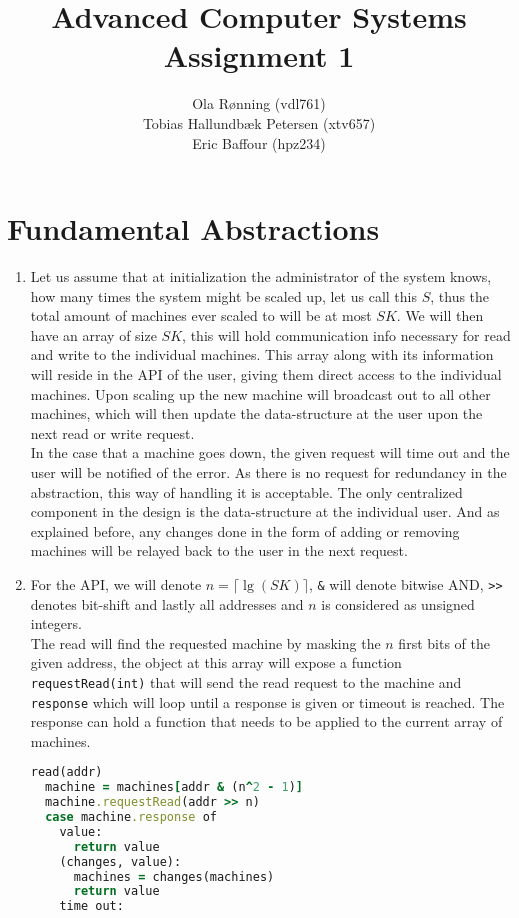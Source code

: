 \documentclass[a4paper]{article}
\author{Ola Rønning (vdl761) \\ Tobias Hallundbæk Petersen (xtv657)\\ Eric Baffour (hpz234)}
\title{Advanced Computer Systems \\ Assignment 1}
\begin{document}
\maketitle
\section{Fundamental Abstractions}
\begin{enumerate}
  \item Let us assume that at initialization the administrator of the system knows, how many times the system might be scaled up, let us call this $S$, thus the total amount of machines ever scaled to will be at most $SK$. We will then have an array of size $SK$, this will hold communication info necessary for read and write to the individual machines. This array along with its information will reside in the API of the user, giving them direct access to the individual machines. Upon scaling up the new machine will broadcast out to all other machines, which will then update the data-structure at the user upon the next read or write request.\\
    In the case that a machine goes down, the given request will time out and the user will be notified of the error. As there is no request for redundancy in the abstraction, this way of handling it is acceptable.
    The only centralized component in the design is the data-structure at the individual user. And as explained before, any changes done in the form of adding or removing machines will be relayed back to the user in the next request.
  \item For the API, we will denote $n = \lceil \lg (SK) \rceil$, \texttt{\&} will denote bitwise AND, \texttt{>>} denotes bit-shift and lastly all addresses and $n$ is considered as unsigned integers.\\
    The read will find the requested machine by masking the $n$ first bits of the given address, the object at this array will expose a function \texttt{requestRead(int)} that will send the read request to the machine and \texttt{response} which will loop until a response is given or timeout is reached. The response can hold a function that needs to be applied to the current array of machines.
    \begin{lstlisting}[language=Ruby, caption={READ}]
read(addr)
  machine = machines[addr & (n^2 - 1)]
  machine.requestRead(addr >> n)
  case machine.response of
    value:
      return value
    (changes, value):
      machines = changes(machines)
      return value
    time out:

\end{lstlisting}
\end{enumerate}
\end{document}
